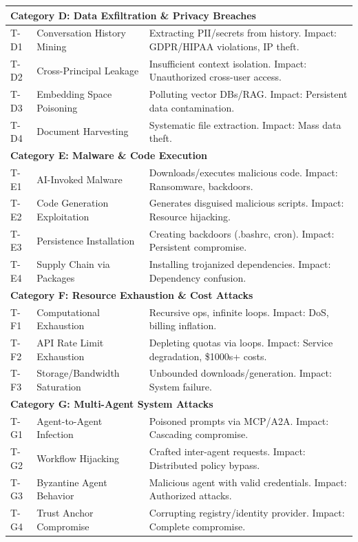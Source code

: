 {\begin{tabular}{|l|p{3cm}|p{12.8cm}|}
\multicolumn{3}{|l|}{\textbf{Category D: Data Exfiltration \& Privacy Breaches}} \\
\hline
T-D1 & Conversation History Mining & Extracting PII/secrets from history. Impact: GDPR/HIPAA violations, IP theft. \\
T-D2 & Cross-Principal Leakage & Insufficient context isolation. Impact: Unauthorized cross-user access. \\
T-D3 & Embedding Space Poisoning & Polluting vector DBs/RAG. Impact: Persistent data contamination. \\
T-D4 & Document Harvesting & Systematic file extraction. Impact: Mass data theft. \\
\hline
\multicolumn{3}{|l|}{\textbf{Category E: Malware \& Code Execution}} \\
\hline
T-E1 & AI-Invoked Malware & Downloads/executes malicious code. Impact: Ransomware, backdoors. \\
T-E2 & Code Generation Exploitation & Generates disguised malicious scripts. Impact: Resource hijacking. \\
T-E3 & Persistence Installation & Creating backdoors (.bashrc, cron). Impact: Persistent compromise. \\
T-E4 & Supply Chain via Packages & Installing trojanized dependencies. Impact: Dependency confusion. \\
\hline
\multicolumn{3}{|l|}{\textbf{Category F: Resource Exhaustion \& Cost Attacks}} \\
\hline
T-F1 & Computational Exhaustion & Recursive ops, infinite loops. Impact: DoS, billing inflation. \\
T-F2 & API Rate Limit Exhaustion & Depleting quotas via loops. Impact: Service degradation, \$1000s+ costs. \\
T-F3 & Storage/Bandwidth Saturation & Unbounded downloads/generation. Impact: System failure. \\
\hline
\multicolumn{3}{|l|}{\textbf{Category G: Multi-Agent System Attacks}} \\
\hline
T-G1 & Agent-to-Agent Infection & Poisoned prompts via MCP/A2A. Impact: Cascading compromise. \\
T-G2 & Workflow Hijacking & Crafted inter-agent requests. Impact: Distributed policy bypass. \\
T-G3 & Byzantine Agent Behavior & Malicious agent with valid credentials. Impact: Authorized attacks. \\
T-G4 & Trust Anchor Compromise & Corrupting registry/identity provider. Impact: Complete compromise. \\

\end{tabular}}
